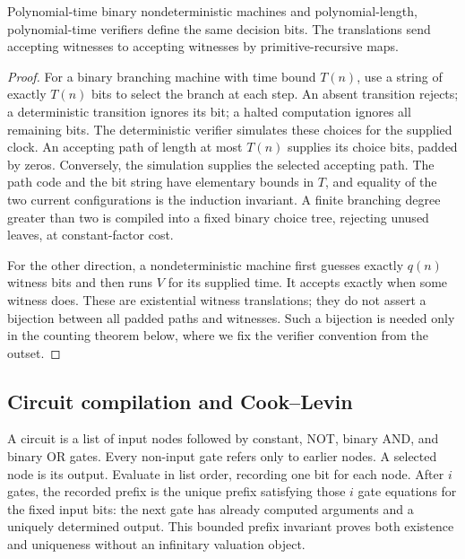 \begin{theorem}\label{thm:N02}
Polynomial-time binary nondeterministic machines and polynomial-length,
polynomial-time verifiers define the same decision bits. The translations
send accepting witnesses to accepting witnesses by primitive-recursive maps.
\end{theorem}
\begin{proof}
For a binary branching machine with time bound $T(n)$, use a string of exactly
$T(n)$ bits to select the branch at each step. An absent transition rejects;
a deterministic transition ignores its bit; a halted computation ignores all
remaining bits. The deterministic verifier simulates these choices for the
supplied clock. An accepting path of length at most $T(n)$ supplies its choice
bits, padded by zeros. Conversely, the simulation supplies the selected
accepting path. The path code and the bit string have elementary bounds in
$T$, and equality of the two current configurations is the induction
invariant. A finite branching degree greater than two is compiled into a
fixed binary choice tree, rejecting unused leaves, at constant-factor cost.

For the other direction, a nondeterministic machine first guesses exactly
$q(n)$ witness bits and then runs $V$ for its supplied time. It accepts exactly
when some witness does. These are existential witness translations; they do
not assert a bijection between all padded paths and witnesses. Such a
bijection is needed only in the counting theorem below, where we fix the
verifier convention from the outset.
\end{proof}

\subsection{Circuit compilation and Cook--Levin}

A circuit is a list of input nodes followed by constant, NOT, binary AND, and
binary OR gates. Every non-input gate refers only to earlier nodes. A selected
node is its output. Evaluate in list order, recording one bit for each node.
After $i$ gates, the recorded prefix is the unique prefix satisfying those
$i$ gate equations for the fixed input bits: the next gate has already
computed arguments and a uniquely determined output. This bounded prefix
invariant proves both existence and uniqueness without an infinitary
valuation object.

